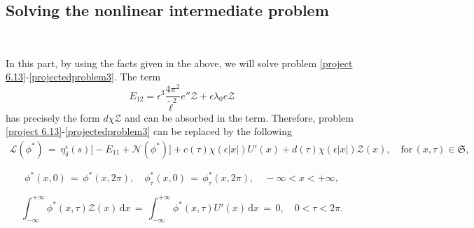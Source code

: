 \documentclass[10pt, reqno]{amsart}
\numberwithin{equation}{section}
\theoremstyle{definition}
\begin{document}
{{\subsection{ Solving the nonlinear intermediate problem}\label{Section6.4}\

In this part, by using the facts given in the above, we will solve problem \eqref{project 6.13}-\eqref{projectedproblem3}.
The term
\begin{equation*}
 E_{12} = \epsilon^3\frac{4\pi^2}{{\tilde\ell}^2} e''\mathcal Z+ \epsilon\lambda_0 e{\mathcal Z}
\end{equation*}
has precisely the form $d \chi{\mathcal Z}$ and can be absorbed in the term.
Therefore, problem \eqref{project 6.13}-\eqref{projectedproblem3} can be replaced by the following
\begin{align} \label{projectedproblem1-refined-e11}
\mathcal L (\phi^*) \,=\, \eta_\delta^\epsilon(s) \Big[- E_{11}+ {\mathcal N}(\phi^*)\Big]
+ c(\tau) \chi(\epsilon|x|) U'(x)
+ d(\tau) \chi(\epsilon|x|){\mathcal Z}(x), \quad \text{for}\,(x, \tau)\in \mathfrak S,
\end{align}

\begin{equation}
{\phi^* }(x, 0) \,=\, {\phi^* }(x, 2\pi), \quad \phi^*_\tau(x, 0) \,=\, \phi^* _\tau(x, 2\pi),
\quad
-\infty<x<+\infty,
\end{equation}

\begin{equation}
\label{projectedproblem3-refined-aa}
 \int_{-\infty}^{+\infty} \phi^*(x, \tau){\mathcal Z}(x) \,{\mathrm d}x \,=\, \int_{-\infty}^{+\infty} \phi^*(x, \tau) U'(x)\,{\mathrm d}x \,=\, 0, \quad 0<\tau<2\pi.
\end{equation}

}}
\end{document}
